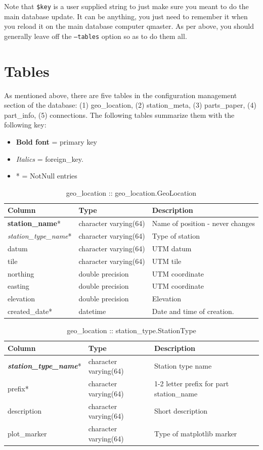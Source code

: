 \documentclass{article}
\begin{document}
Note that {\tt \$key} is a user supplied string to just make sure you meant to do the main database update.  It can be anything, you
just need to remember it when you reload it on the main database computer qmaster.
As per above, you should generally leave off the {\tt --tables} option so as to do them all.  

\section{Tables}
As mentioned above, there are five tables in the configuration management section of the database:  (1) geo\_location, (2) station\_meta,
(3) parts\_paper, (4) part\_info, (5) connections.  The following tables summarize them with the following key:  
\begin{itemize}\setlength\itemsep{-.3em}
	\item {\bf Bold font} = primary key
	\item {\em Italics} = foreign\_key.
	\item * = NotNull entries
\end{itemize}

\begin{table}[h]
\centering
\caption{geo\_location :: geo\_location.GeoLocation}
\begin{tabular}{| l | l | l |} \hline
{\bf Column} & {\bf Type} & {\bf Description} \\ \hline
{\bf station\_name}*  & character varying(64) & Name of position - never changes \\ \hline
{\em station\_type\_name}* & character varying(64) & Type of station \\ \hline
datum & character varying(64) & UTM datum \\ \hline
tile & character varying(64) & UTM tile \\ \hline
northing & double precision & UTM coordinate \\ \hline
easting & double precision & UTM coordinate \\ \hline
elevation & double precision & Elevation \\ \hline
created\_date* & datetime & Date and time of creation. \\ \hline
\end{tabular}
\end{table}

\begin{table}[h]
\centering
\caption{geo\_location :: station\_type.StationType}
\begin{tabular}{| l | l | l |} \hline
{\bf Column} & {\bf Type} & {\bf Description} \\ \hline
{\bf \em station\_type\_name}* &  character varying(64) &  Station type name \\ \hline
prefix* & character varying(64) & 1-2 letter prefix for part station\_name \\ \hline
description & character varying(64) &  Short description \\ \hline
plot\_marker & character varying(64) & Type of matplotlib marker \\ \hline
\end{tabular}
\end{table}
\end{document}
